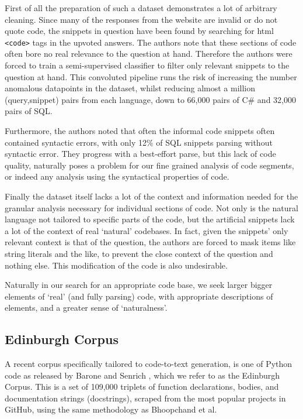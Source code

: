 First of all the preparation of such a dataset demonstrates a lot of arbitrary cleaning.
Since many of the responses from the website are invalid or do not quote code, the snippets in question have been found by searching for html \texttt{<code>} tags in the upvoted answers. 
The authors note that these sections of code often bore no real relevance to the question at hand. Therefore the authors were forced to train a semi-supervised classifier to filter only relevant snippets to the question at hand.
This convoluted pipeline runs the risk of increasing the number anomalous datapoints in the dataset, whilst reducing almost a million (query,snippet) pairs from each language, down to 66,000 pairs  of C\# and 32,000 pairs of SQL.

Furthermore, the authors noted that often the informal code snippets often contained syntactic errors, with only 12\% of SQL snippets parsing without syntactic error. They progress with a best-effort parse, but this
 lack of code quality, naturally poses a problem for our fine grained analysis of code segments, or indeed any analysis using the syntactical properties of code.

Finally the dataset itself lacks a lot of the context and information needed for the granular analysis necessary for individual sections of code. Not only is the natural language not tailored to specific parts of the code, but the artificial snippets lack a lot of the context of real `natural' codebases. In fact, given the snippets' only relevant context is that of the question, the authors are forced to mask items like string literals and the like, to prevent the close context of the question and nothing else. This modification of the code is also undesirable.

Naturally in our search for an appropriate code base, we seek larger bigger elements of `real' (and fully parsing) code, with appropriate descriptions of elements, and a greater sense of `naturalness'.

\subsection{Edinburgh Corpus}

A recent corpus specifically tailored to code-to-text generation, is one of Python code as released by Barone and Senrich \cite{barone_parallel_2017}, which we refer to as the Edinburgh Corpus. 
This is a set of 109,000 triplets of function declarations, bodies, and documentation strings (docstrings), scraped from the most popular projects in GitHub, using the same methodology as Bhoopchand et al. 

